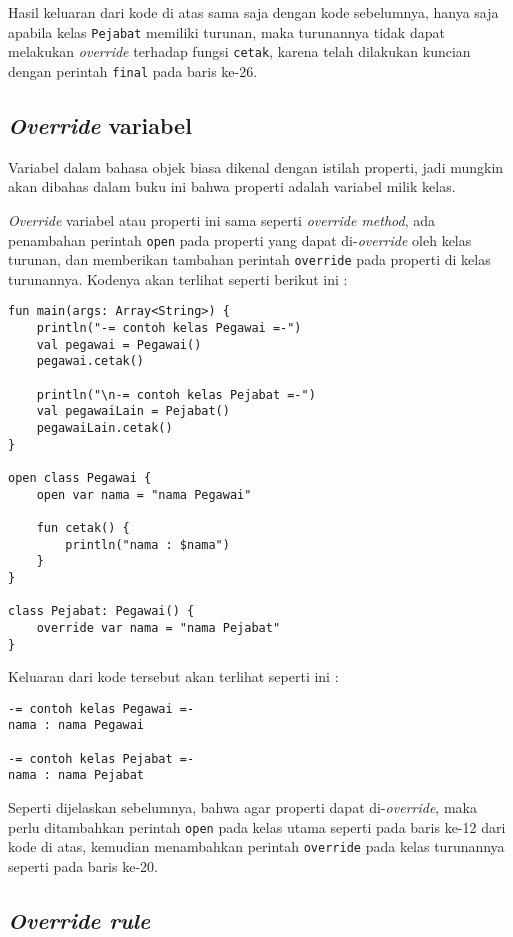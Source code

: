 Hasil keluaran dari kode di atas sama saja dengan kode sebelumnya, hanya saja apabila kelas \texttt{Pejabat} memiliki turunan, maka turunannya tidak dapat melakukan \textit{override} terhadap fungsi \texttt{cetak}, karena telah dilakukan kuncian dengan perintah \texttt{final} pada baris ke-26.

\subsection{\textit{Override} variabel}

Variabel dalam bahasa objek biasa dikenal dengan istilah properti, jadi mungkin akan dibahas dalam buku ini bahwa properti adalah variabel milik kelas.

\textit{Override} variabel atau properti ini sama seperti \textit{override method}, ada penambahan perintah \texttt{open} pada properti yang dapat di-\textit{override} oleh kelas turunan, dan memberikan tambahan perintah \texttt{override} pada properti di kelas turunannya. Kodenya akan terlihat seperti berikut ini :

\begin{lstlisting}
fun main(args: Array<String>) {
	println("-= contoh kelas Pegawai =-")
	val pegawai = Pegawai()
	pegawai.cetak()
	
	println("\n-= contoh kelas Pejabat =-")
	val pegawaiLain = Pejabat()
	pegawaiLain.cetak()
}

open class Pegawai {
	open var nama = "nama Pegawai"
	
	fun cetak() {
		println("nama : $nama")
	}
}

class Pejabat: Pegawai() {
	override var nama = "nama Pejabat"
}
\end{lstlisting}

Keluaran dari kode tersebut akan terlihat seperti ini :

\begin{lstlisting}
-= contoh kelas Pegawai =-
nama : nama Pegawai

-= contoh kelas Pejabat =-
nama : nama Pejabat
\end{lstlisting}

Seperti dijelaskan sebelumnya, bahwa agar properti dapat di-\textit{override}, maka perlu ditambahkan perintah \texttt{open} pada kelas utama seperti pada baris ke-12 dari kode di atas, kemudian menambahkan perintah \texttt{override} pada kelas turunannya seperti pada baris ke-20.

\subsection{\textit{Override rule}}

